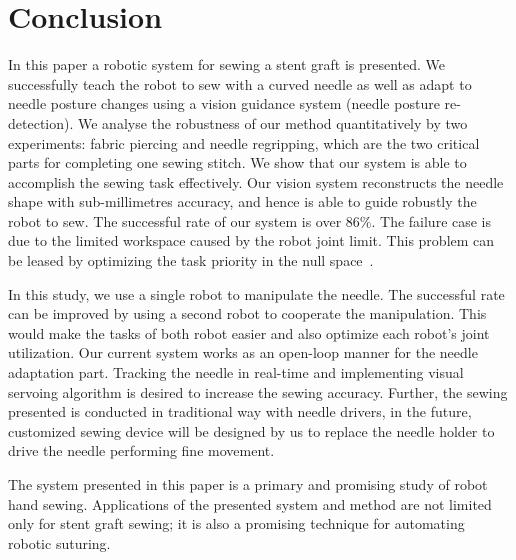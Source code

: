 \section{Conclusion} 

In this paper a robotic system for sewing a stent graft is presented. We successfully teach the robot to sew with a curved needle as well as adapt to needle posture changes using a vision guidance system (needle posture re-detection). We analyse the robustness of our method quantitatively by two experiments: fabric piercing and needle regripping, which are the two critical parts for completing one sewing stitch. We show that our system is able to accomplish the sewing task effectively. Our vision system reconstructs the needle shape with sub-millimetres accuracy, and hence is able to guide robustly the robot to sew. The successful rate of our system is over 86$\%$. The failure case is due to the limited workspace caused by the robot joint limit. This problem can be leased by optimizing the task priority in the null space~\cite{yang2015}.

In this study, we use a single robot to manipulate the needle. The successful rate can be improved by using a second robot to cooperate the manipulation. This would make the tasks of both robot easier and also optimize each robot’s joint utilization. Our current system works as an open-loop manner for the needle adaptation part. Tracking the needle in real-time and implementing visual servoing algorithm is desired to increase the sewing accuracy. Further, the sewing presented is conducted in traditional way with needle drivers, in the future, customized sewing device will be designed by us to replace the needle holder to drive the needle performing fine movement. 

The system presented in this paper is a primary and promising study of robot hand sewing. Applications of the presented system and method are not limited only for stent graft sewing; it is also a promising technique for automating robotic suturing.
